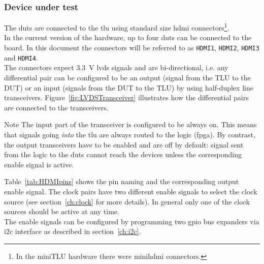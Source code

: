 \subsubsection{Device under test}\label{ch:dut}
The \gls{dut}s are connected to the \gls{tlu} using standard size \gls{hdmi} connectors\footnote{In the miniTLU hardware there were mini\gls{hdmi} connectors.}.\\
In the current version of the hardware, up to four \gls{dut}s can be connected to the board. In this document the connectors will be referred to as \verb|HDMI1|, \verb|HDMI2|, \verb|HDMI3| and \verb|HDMI4|.\\
The connectors expect 3.3~V \gls{lvds} signals and are bi-directional, i.e. any differential pair can be configured to be an output (signal from the TLU to the DUT) or an input (signals from the DUT to the TLU) by using half-duplex line transceivers. Figure~\ref{fig:LVDSTransceiver} illustrates how the differential pairs are connected to the transceivers.
\begin{alertinfo}{Note}
    The input part of the transceiver is configured to be always on. This means that signals going \emph{into} the \gls{tlu} are always routed to the logic (\gls{fpga}). By contrast, the output transceivers have to be enabled and are off by default: signal sent from the logic to the \gls{dut}s cannot reach the devices unless the corresponding enable signal is active.
\end{alertinfo}
Table~\ref{tab:HDMIpins} shows the pin naming and the corresponding output enable signal. The clock pairs have two different enable signals to select the clock source (see section~\ref{ch:clock} for more details). In general only one of the clock sources should be active at any time.\\
The enable signals can be configured by programming two \gls{gpio} bus expanders via \gls{i2c} interface as described in section~\ref{ch:i2c}.
